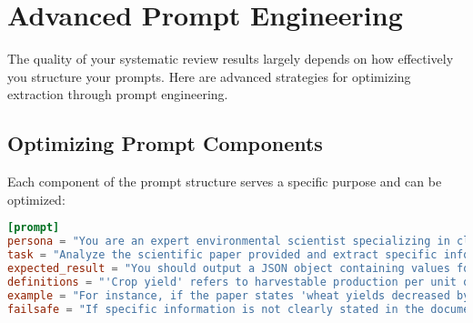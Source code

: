 
\section{Advanced Prompt Engineering}

The quality of your systematic review results largely depends on how effectively you structure your prompts. Here are advanced strategies for optimizing extraction through prompt engineering.

\subsection{Optimizing Prompt Components}

Each component of the prompt structure serves a specific purpose and can be optimized:

\begin{configbox}
\begin{lstlisting}[language=TOML]
[prompt]
persona = "You are an expert environmental scientist specializing in climate change impacts on agriculture, with experience conducting systematic reviews according to PRISMA guidelines."
task = "Analyze the scientific paper provided and extract specific information about climate change impacts on crop yields, methodology used, and adaptation strategies discussed."
expected_result = "You should output a JSON object containing values for each key specified in the review structure. Values must adhere exactly to the prescribed formats and vocabulary."
definitions = "'Crop yield' refers to harvestable production per unit of land area. 'Statistical significance' means p < 0.05 unless otherwise specified in the paper. 'Adaptation strategies' include any interventions meant to reduce negative climate impacts on agriculture."
example = "For instance, if the paper states 'wheat yields decreased by 5.2% (p < 0.01) per degree Celsius warming, with irrigation mitigating 40% of losses', you would extract: {\"crop_type\": \"wheat\", \"climate_factor\": \"temperature increase\", \"yield_impact\": \"-5.2% per °C\", \"statistical_significance\": \"yes\", \"adaptation_strategies_discussed\": \"yes\", \"adaptation_effectiveness\": \"40% loss reduction\"}"
failsafe = "If specific information is not clearly stated in the document, do not speculate or infer beyond reasonable scientific interpretation. Respond with an empty string for missing data. If the paper doesn't address the topic at all, use 'not addressed' for categorical fields."
\end{lstlisting}
\end{configbox}

